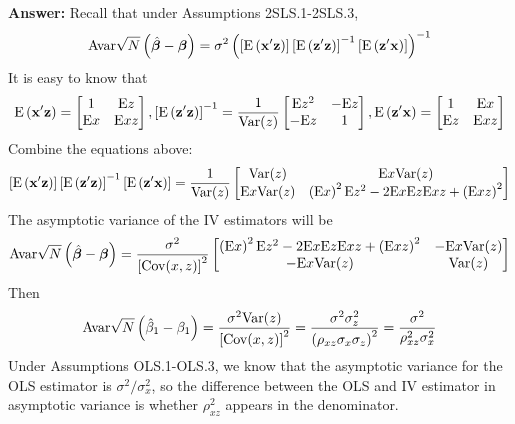 \documentclass[UTF8]{article} %
\begin{document}
\begin{enumerate}
\begin{enumerate}
        \textbf{Answer:} Recall that under Assumptions 2SLS.1-2SLS.3,
        \[ \mathrm{Avar}\sqrt{N}\left(\hat{\bm{\beta}}-\bm{\beta}\right) = \sigma^{2}\left(\left[\mathrm{E}\left(\mathbf{x}^{\prime} \mathbf{z}\right)\right]\left[\mathrm{E}\left(\mathbf{z}^{\prime} \mathbf{z}\right)\right]^{-1} \left[\mathrm{E}\left(\mathbf{z}^{\prime} \mathbf{x}\right)\right]\right)^{-1} \]
        It is easy to know that
        \[ \mathrm{E}\left(\mathbf{x}^{\prime} \mathbf{z}\right) = \begin{bmatrix}
            1 & \mathrm{E}z \\
            \mathrm{E}x & \mathrm{E}xz
        \end{bmatrix},
        \left[\mathrm{E}\left(\mathbf{z}^{\prime} \mathbf{z}\right)\right]^{-1} = \frac{1}{\mathrm{Var}(z)} \begin{bmatrix}
            \mathrm{E}z^2 & -\mathrm{E}z \\
            -\mathrm{E}z & 1
        \end{bmatrix},
        \mathrm{E}\left(\mathbf{z}^{\prime} \mathbf{x}\right) = \begin{bmatrix}
            1 & \mathrm{E}x \\
            \mathrm{E}z & \mathrm{E}xz
        \end{bmatrix} \]
        Combine the equations above: 
        \[ \left[\mathrm{E}\left(\mathbf{x}^{\prime} \mathbf{z}\right)\right]\left[\mathrm{E}\left(\mathbf{z}^{\prime} \mathbf{z}\right)\right]^{-1} \left[\mathrm{E}\left(\mathbf{z}^{\prime} \mathbf{x}\right)\right] = \frac{1}{\mathrm{Var}(z)} \begin{bmatrix}
            \mathrm{Var}(z) & \mathrm{E}x \mathrm{Var}(z) \\
            \mathrm{E}x \mathrm{Var}(z) & \left(\mathrm{E}x\right)^2 \mathrm{E}z^2-2\mathrm{E}x\mathrm{E}z\mathrm{E}xz+\left(\mathrm{E}xz\right)^2
        \end{bmatrix}\]
        The asymptotic variance of the IV estimators will be
        \[\mathrm{Avar}\sqrt{N}\left(\hat{\bm{\beta}}-\bm{\beta}\right) = \frac{\sigma^2}{\left[\mathrm{Cov}(x,z)\right]^2} \begin{bmatrix}
            \left(\mathrm{E}x\right)^2 \mathrm{E}z^2-2\mathrm{E}x\mathrm{E}z\mathrm{E}xz+\left(\mathrm{E}xz\right)^2 & -\mathrm{E}x \mathrm{Var}(z) \\
            -\mathrm{E}x \mathrm{Var}(z) & \mathrm{Var}(z)
        \end{bmatrix}\]
        Then
        \[\mathrm{Avar}\sqrt{N}\left(\hat{\beta}_{1}-\beta_{1}\right) = \frac{\sigma^2\mathrm{Var}(z)}{\left[\mathrm{Cov}(x,z)\right]^2} = \frac{\sigma^2\sigma_z^2}{\left(\rho_{xz}\sigma_x\sigma_z\right)^2} = \frac{\sigma^2}{\rho_{xz}^2\sigma_x^2}\]
        Under Assumptions OLS.1-OLS.3, we know that the asymptotic variance for the OLS estimator is $\sigma^2/\sigma^2_x$, so the difference between the OLS and IV estimator in asymptotic variance is whether $\rho_{xz}^2$ appears in the denominator.
        

\end{enumerate}
\end{enumerate}
\end{document}
